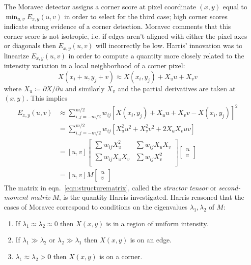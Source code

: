The Moravec detector assigns a corner score at pixel coordinate \((x,y)\) equal to \(\min_{u,v} E_{x,y}(u,v)\) in order to select for the third case; high corner scores indicate strong evidence of a corner detection.
%
Moravec comments that this corner score is not isotropic, i.e. if edges aren't aligned with either the pixel axes or diagonals then \(E_{x,y}(u,v)\) will incorrectly be low.
%
Harris' innovation was to linearize \(E_{x,y}(u,v)\) in order to compute a quantity more closely related to the intensity variation in a local neighborhood of a corner pixel:
\begin{equation}
	X(x_i + u,y_j + v) \approx  X(x_i,y_j) + X_u u + X_v v
\end{equation}
where \(X_u \coloneqq \partial X/\partial u\) and similarly \(X_v\) and the partial derivatives are taken at \((x,y)\).
%
This implies
\begin{align}
	E_{x,y}(u,v) & \approx \sum_{i,j=-m/2}^{m/2} w_{ij} \left[X(x_i,y_j) + X_u u + X_v v - X(x_i,y_j)\right]^2                 \\
	             & = \sum_{i,j=-m/2}^{m/2} w_{ij} \left[ X_u^2 u^2 + X_v^2 v^2 + 2 X_u X_v u v\right] \\
	             & = \left[ u,v \right] \begin{bmatrix}
		\sum w_{ij}X_u^2   & \sum w_{ij}X_u X_v \\
		\sum w_{ij}X_u X_v & \sum w_{ij}X_v^2   \\
	\end{bmatrix}  \begin{bmatrix}
		u \\
		v
	\end{bmatrix}          \\
	             & = \left[ u,v \right] M  \begin{bmatrix}
		u \\
		v
	\end{bmatrix} \label{eqn:structurematrix}
\end{align}
%
The matrix in eqn.~\eqref{eqn:structurematrix}, called the \textit{structor tensor} or \textit{second-moment matrix} \(M\), is the quantity Harris investigated.
%
Harris reasoned that the cases of Moravec correspond to conditions on the eigenvalues \(\lambda_1, \lambda_2\) of \(M\):
\begin{framed}
	\begin{enumerate}
		\item If \(\lambda_1 \approx \lambda_2 \approx 0\) then \(X(x,y)\) is in a region of uniform intensity.
		\item If \(\lambda_1 \gg \lambda_2\) or \(\lambda_2 \gg \lambda_1\) then \(X(x,y)\) is on an edge.
		\item \(\lambda_1 \approx \lambda_2 > 0\) then \(X(x,y)\) is on a corner.
	\end{enumerate}
\end{framed}

